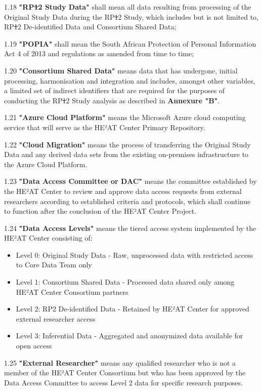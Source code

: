 \documentclass[12pt,letterpaper]{article}
\newcommand{\deleted}[1]{\textcolor{deletecolor}{\sout{#1}}}
\newcommand{\added}[1]{\textcolor{addcolor}{#1}}
\begin{document}
1.18 \textbf{"RP\deleted{1}\added{2} Study Data"} shall mean all data resulting from processing of the Original Study Data during the RP\deleted{1}\added{2} Study, which includes but is not limited to, RP\deleted{1}\added{2} De-identified Data and Consortium Shared Data;

1.19 \textbf{"POPIA"} shall mean the South African Protection of Personal Information Act 4 of 2013 and regulations as amended from time to time;

1.20 \textbf{"Consortium Shared Data"} means data that has undergone, initial processing, harmonisation and integration and includes, amongst other variables, a limited set of indirect identifiers that are required for the purposes of conducting the RP\deleted{1}\added{2} Study analysis as described in \textbf{Annexure "B"}.

\added{1.21 \textbf{"Azure Cloud Platform"} means the Microsoft Azure cloud computing service that will serve as the HE²AT Center Primary Repository.}

\added{1.22 \textbf{"Cloud Migration"} means the process of transferring the Original Study Data and any derived data sets from the existing on-premises infrastructure to the Azure Cloud Platform.}

\added{1.23 \textbf{"Data Access Committee or DAC"} means the committee established by the HE²AT Center to review and approve data access requests from external researchers according to established criteria and protocols, which shall continue to function after the conclusion of the HE²AT Center Project.}

\added{1.24 \textbf{"Data Access Levels"} means the tiered access system implemented by the HE²AT Center consisting of:
\begin{itemize}
   \item Level 0: Original Study Data - Raw, unprocessed data with restricted access to Core Data Team only
   \item Level 1: Consortium Shared Data - Processed data shared only among HE²AT Center Consortium partners
   \item Level 2: RP2 De-identified Data - Retained by HE²AT Center for approved external researcher access
   \item Level 3: Inferential Data - Aggregated and anonymized data available for open access
\end{itemize}}

\added{1.25 \textbf{"External Researcher"} means any qualified researcher who is not a member of the HE²AT Center Consortium but who has been approved by the Data Access Committee to access Level 2 data for specific research purposes.}
\end{document}
